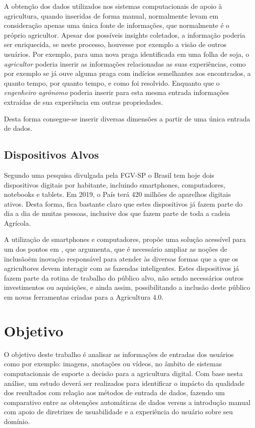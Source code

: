 \documentclass[12pt]{article}
\begin{document}
A obtenção dos dados utilizados nos sistemas computacionais de apoio à agricultura, quando inseridas de forma manual, normalmente levam em consideração apenas uma única fonte de informações, que normalmente é o próprio agricultor. Apesar dos possíveis insights coletados, a informação poderia ser enriquecida, se neste processo, houvesse por exemplo a visão de outros usuários. Por exemplo, para uma nova praga identificada em uma folha de soja, o \textit{agricultor} poderia inserir as informações relacionadas as suas experiências, como por exemplo se já ouve alguma praga com indícios semelhantes aos encontrados, a quanto tempo, por quanto tempo, e como foi resolvido. Enquanto que o \textit{engenheiro agrônomo} poderia inserir para esta mesma entrada informações extraídas de sua experiência em outras propriedades.

Desta forma consegue-se inserir diversas dimensões a partir de uma única entrada de dados.

\subsection{Dispositivos Alvos}

Segundo uma pesquisa divulgada pela FGV-SP o Brasil tem hoje dois dispositivos digitais por habitante, incluindo smartphones, computadores, notebooks e tablets. Em 2019, o País terá 420 milhões de aparelhos digitais ativos. Desta forma, fica bastante claro que estes dispositivos já fazem parte do dia a dia de muitas pessoas, inclusive dos que fazem parte de toda a cadeia Agrícola.

A utilização de smartphones e computadores, propõe uma solução acessível para um dos pontos em \cite{agriculture-40-rose}, que argumenta, que é necessário ampliar as noções de \"inclusão\" em inovação responsável para atender às diversas formas que a que os agricultores devem interagir com as fazendas inteligentes. Estes dispositivos já fazem parte da rotina de trabalho do público alvo, não sendo necessários outros investimentos ou aquisições, e ainda assim, possibilitando a inclusão deste público em novas ferramentas criadas para a Agricultura 4.0.

\section{Objetivo}

O objetivo deste trabalho é analisar as informações de entradas dos usuários como por exemplo: imagens, anotações ou vídeos, no âmbito de sistemas computacionais de suporte a decisão para a agricultura digital. Com base nesta análise, um estudo deverá ser realizados para identificar o impácto da qualidade dos resultados com relação aos métodos de entrada de dados, fazendo um comparativo entre as obtenções automáticas de dados versus a introdução manual com apoio de diretrizes de usuabilidade e a experiência do usuário sobre seu domínio.
\end{document}
